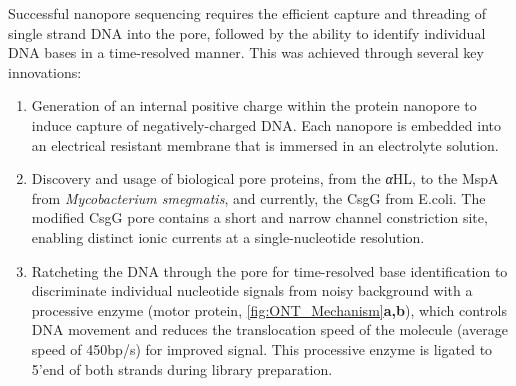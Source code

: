 Successful nanopore sequencing requires the efficient capture and threading of single strand DNA into the pore, followed by the ability to identify individual DNA bases in a time-resolved manner. This was achieved through several key innovations\cite{Bayley2015}: 
\begin{enumerate}
	\item Generation of an internal positive charge within the protein nanopore to induce capture of negatively-charged DNA. Each nanopore is embedded into an electrical resistant membrane that is immersed in an electrolyte solution.
	\item Discovery and usage of biological pore proteins, from the \textit{α}HL\cite{N2005}, to the MspA from \textit{Mycobacterium smegmatis}\cite{Manrao2011}, and currently, the CsgG from E.coli. The modified CsgG pore contains a short and narrow channel constriction site, enabling distinct ionic currents at a single-nucleotide resolution. 
	\item Ratcheting the DNA through the pore for time-resolved base identification to discriminate individual nucleotide signals from noisy background with a processive enzyme (motor protein, \cref{fig:ONT_Mechanism}\textbf{a,b}), which controls DNA movement and reduces the translocation speed of the molecule (average speed of 450bp/s) for improved signal\cite{Rang2018}. This processive enzyme is ligated to 5'end of both strands during library preparation.   
\end{enumerate}

